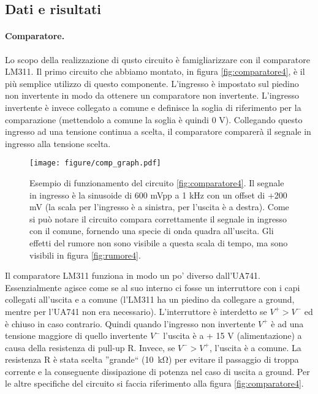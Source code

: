\subsection{Dati e risultati}

\paragraph{Comparatore.}

Lo scopo della realizzazione di qusto circuito è famigliarizzare con il comparatore LM311. Il primo circuito che abbiamo montato, in figura
\ref{fig:comparatore4}, è il più semplice utilizzo di questo componente. L'ingresso è
impostato sul piedino non invertente in modo da ottenere un comparatore non invertente.
L'ingresso invertente è invece collegato a comune e definisce la soglia di riferimento per
la comparazione (mettendolo a comune la soglia è quindi 0 V). Collegando questo ingresso
ad una tensione continua a scelta, il comparatore comparerà il segnale in ingresso alla
tensione scelta.

\begin{SCfigure*}
	\texttt{[image: figure/comp\_graph.pdf]}
	\caption{Esempio di funzionamento del circuito \ref{fig:comparatore4}. Il segnale in ingresso
		è la sinusoide di 600 mVpp a 1 kHz con un offset di +200 mV (la scala per l'ingresso è a 
		sinistra, per l'uscita è a destra). Come si può notare il circuito
		compara correttamente il segnale in ingresso con il comune, fornendo una specie di onda quadra
		all'uscita. Gli effetti del rumore non sono visibile a questa scala di tempo, ma sono visibili in
		figura \ref{fig:rumore4}.}
	\label{fig:comp_graph4}
\end{SCfigure*}

Il comparatore LM311 funziona in modo un po' diverso dall'UA741. Essenzialmente agisce come
se al suo interno ci fosse un interruttore con i capi collegati all'uscita e a comune
(l'LM311 ha un piedino da collegare a ground, mentre per l'UA741 non era necessario).
L'interruttore è interdetto se $V^+ > V^-$ ed è chiuso in caso contrario.
Quindi quando l'ingresso non invertente $V^+$ è ad una tensione maggiore di quello invertente $V^-$
l'uscita è a + 15 V (alimentazione) a causa della resistenza di pull-up R.
Invece, se $V^- > V^+$, l'uscita è a comune. La resistenza R è stata scelta
''grande`` (\SI{10}{\kilo\ohm}) per evitare il passaggio di troppa corrente e la conseguente
dissipazione di potenza nel caso di uscita a ground.
Per le altre specifiche del circuito si faccia riferimento alla figura \ref{fig:comparatore4}.

